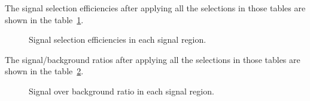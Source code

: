 The signal selection efficiencies after applying all the selections in those tables are shown in the table~\ref{tab:selectioneff}.

\begin{figure}[H]
    \centering
        \caption{Signal selection efficiencies in each signal region.}
        \label{tab:selectioneff}
\end{figure}

The signal/background ratios after applying all the selections in those tables are shown in the table~\ref{tab:soverb}.

\begin{figure}[H]
    \centering
        \caption{Signal over background ratio in each signal region.}
        \label{tab:soverb}
\end{figure}
